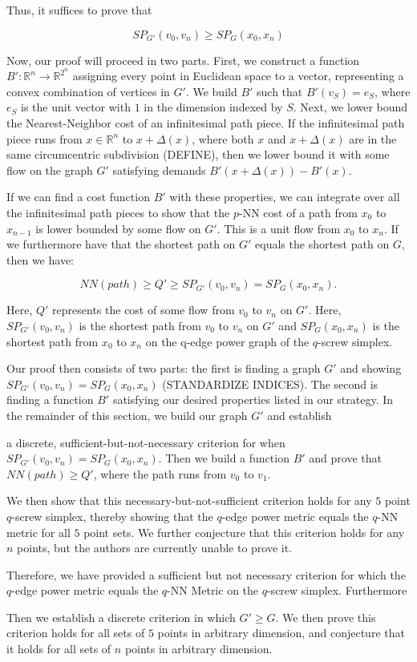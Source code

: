 Thus, it suffices to prove that

\[ SP_{G'}(v_0, v_n) \geq SP_G(x_0, x_n) \]




Now, our proof will proceed in two parts. First, we construct a function
$B':\mathbb{R}^n \rightarrow \mathbb{R}^{2^n}$ assigning every point in
Euclidean space to a vector, representing a convex combination of vertices in
$G'$. We build $B'$ such that $B'(v_S)= e_S$, where $e_S$ is the unit vector
with $1$ in the dimension indexed by $S$. Next, we lower bound the
Nearest-Neighbor cost of an infinitesimal path piece. If the infinitesimal path
piece runs from $x \in \mathbb{R}^n$ to $x+\Delta(x)$, where both $x$ and
$x+\Delta(x)$ are in the same circumcentric subdivision (DEFINE), then we lower
bound it with some flow on the graph $G'$ satisfying demands $B'(x+\Delta(x)) -
B'(x)$.

If we can find a cost function $B'$ with these properties, we can integrate
over all the infinitesimal path pieces to show that the $p$-NN cost of a path
from $x_0$ to $x_{n-1}$ is lower bounded by some flow on $G'$. This is a unit
flow from $x_0$ to $x_n$. If we furthermore have that the shortest path on $G'$
equals the shortest path on $G$, then we have:

$$NN(path) \geq Q' \geq SP_{G'}(v_0, v_n) = SP_{G}(x_0, x_n).$$

Here, $Q'$ represents the cost of some flow from $v_0$ to $v_n$ on $G'$. Here,
$SP_{G'}(v_0, v_n)$ is the shortest path from $v_0$ to $v_n$ on $G'$ and
$SP_G(x_0, x_n)$ is the shortest path from $x_0$ to $x_n$ on the q-edge power
graph of the $q$-screw simplex.

Our proof then consists of two parts: the first is finding a graph $G'$ and
showing $SP_{G'}(v_0, v_n) = SP_G(x_0, x_n)$ (STANDARDIZE INDICES). The second
is finding a function $B'$ satisfying our desired properties listed in our
strategy. In the remainder of this section, we build our graph $G'$ and
establish

a discrete, sufficient-but-not-necessary criterion for when $SP_{G'}(v_0, v_n)
= SP_G(x_0, x_n)$. Then we build a function $B'$ and prove that $NN(path) \geq
Q'$, where the path runs from $v_0$ to $v_1$.

We then show that this necessary-but-not-sufficient criterion holds for any $5$
point $q$-screw simplex, thereby showing that the $q$-edge power metric equals
the $q$-NN metric for all $5$ point sets. We further conjecture that this
criterion holds for any $n$ points, but the authors are currently unable to
prove it.

Therefore, we have provided a sufficient but not necessary criterion for which
the $q$-edge power metric equals the $q$-NN Metric on the $q$-screw simplex.
Furthermore

Then we establish a discrete criterion in which $G' \geq G$. We then prove this
criterion holds for all sets of $5$ points in arbitrary dimension, and
conjecture that it holds for all sets of $n$ points in arbitrary dimension.
